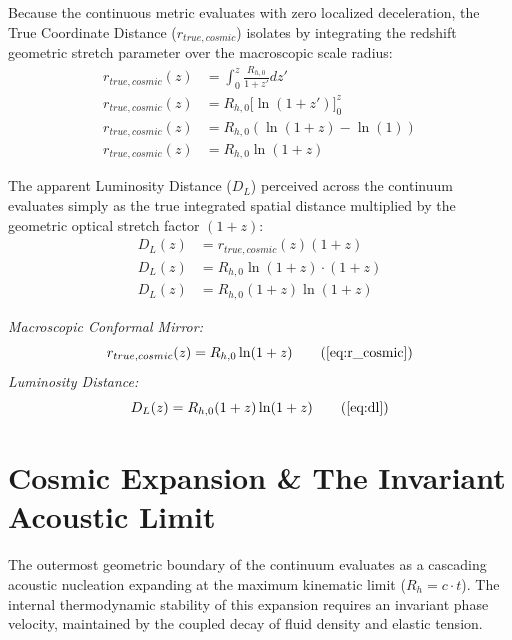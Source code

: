 \documentclass[11pt, a4paper]{article}
\begin{document}
Because the continuous metric evaluates with zero localized deceleration, the True Coordinate Distance ($r_{true, cosmic}$) isolates   by integrating the redshift geometric stretch parameter over the macroscopic scale radius:
\begin{align}
    r_{true, cosmic}(z) &= \int_0^z \frac{R_{h,0}}{1+z'} dz' \\
    r_{true, cosmic}(z) &= R_{h,0} \Big[\ln(1+z')\Big]_0^z \\
    r_{true, cosmic}(z) &= R_{h,0} (\ln(1+z) - \ln(1)) \\
    r_{true, cosmic}(z) &= R_{h,0} \ln(1+z)
\end{align}

The apparent Luminosity Distance ($D_L$) perceived across the continuum evaluates simply as the true integrated spatial distance multiplied by the geometric optical stretch factor $(1+z)$:
\begin{align}
    D_L(z) &= r_{true, cosmic}(z)(1+z) \\
    D_L(z) &= R_{h,0} \ln(1+z) \cdot (1+z) \\
    D_L(z) &= R_{h,0} (1+z) \ln(1+z)
\end{align}

\begin{tcolorbox}[recallbox, title={\ref{box:optical_dilatation}. Optical Dilatation}]
\textit{Macroscopic Conformal Mirror:}
\begin{equation}
    r_{true, cosmic}(z) = R_{h,0} \ln(1+z) \tag{\ref{eq:r_cosmic}}
\end{equation}
\textit{Luminosity Distance:}
\begin{equation}
    D_L(z) = R_{h,0} (1+z) \ln(1+z) \tag{\ref{eq:dl}}
\end{equation}
\end{tcolorbox}






\section{Cosmic Expansion \& The Invariant Acoustic Limit}
\label{sec:deriv_acoustic_invariance}

The outermost geometric boundary of the continuum evaluates as a cascading acoustic nucleation expanding at the maximum kinematic limit ($R_h = c \cdot t$). The internal thermodynamic stability of this expansion requires an invariant phase velocity, maintained by the coupled decay of fluid density and elastic tension.
\end{document}

